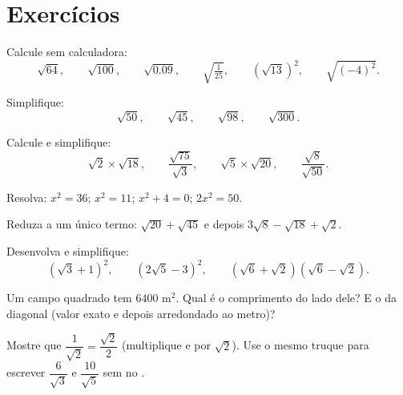 \section{Exercícios}

\begin{exercise}[$\star$]\label{exo:g9:sqrt:1}
Calcule sem calculadora:
\[
\sqrt{64}, \qquad \sqrt{100}, \qquad \sqrt{0.09}, \qquad
\sqrt{\tfrac{1}{25}}, \qquad \left(\sqrt{13}\right)^2, \qquad
\sqrt{(-4)^2} .
\]
\end{exercise}

\begin{exercise}[$\star$]\label{exo:g9:sqrt:2}
Simplifique:
\[
\sqrt{50}, \qquad \sqrt{45}, \qquad \sqrt{98}, \qquad \sqrt{300} .
\]
\end{exercise}

\begin{exercise}[$\star$]\label{exo:g9:sqrt:3}
Calcule e simplifique:
\[
\sqrt2 \times \sqrt{18}, \qquad
\frac{\sqrt{75}}{\sqrt3}, \qquad
\sqrt5 \times \sqrt{20}, \qquad
\frac{\sqrt{8}}{\sqrt{50}} .
\]
\end{exercise}

\begin{exercise}[$\star$]\label{exo:g9:sqrt:4}
Resolva: $x^2 = 36$; \quad $x^2 = 11$; \quad $x^2 + 4 = 0$; \quad
$2x^2 = 50$.
\end{exercise}

\begin{exercise}[$\star$]\label{exo:g9:sqrt:5}
Reduza a um único termo: $\sqrt{20} + \sqrt{45}$ e depois
$3\sqrt8 - \sqrt{18} + \sqrt2$.
\end{exercise}

\begin{exercise}[$\star\star$]\label{exo:g9:sqrt:6}
Desenvolva e simplifique:
\[
\left(\sqrt3 + 1\right)^2, \qquad
\left(2\sqrt5 - 3\right)^2, \qquad
\left(\sqrt6 + \sqrt2\right)\left(\sqrt6 - \sqrt2\right).
\]
\end{exercise}

\begin{exercise}[$\star\star$]\label{exo:g9:sqrt:7}
Um campo quadrado tem  $6400$ m$^2$. Qual é o comprimento do lado
dele? E o da diagonal (valor exato e depois arredondado ao metro)?
\end{exercise}

\begin{exercise}[$\star\star$]\label{exo:g9:sqrt:8}
Mostre que $\dfrac{1}{\sqrt2} = \dfrac{\sqrt2}{2}$ (multiplique
 e  por $\sqrt2$). Use o mesmo truque para escrever
$\dfrac{6}{\sqrt3}$ e $\dfrac{10}{\sqrt5}$ sem  no
.
\end{exercise}

